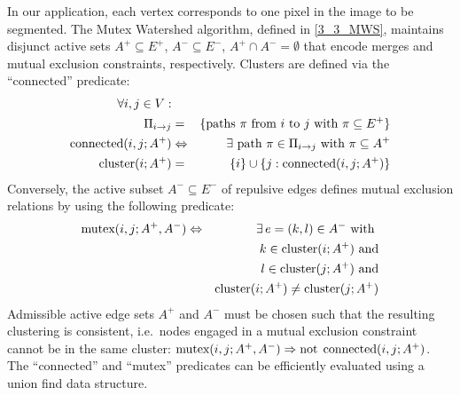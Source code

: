 In our application, each vertex corresponds to one pixel in the image to be segmented. 
The Mutex Watershed algorithm, defined in \autoref{3_3_MWS}, maintains disjunct active sets $A^+ \subseteq E^+$, $A^- \subseteq E^-$, $A^+ \cap A^- = \emptyset$ that encode merges and mutual exclusion constraints, respectively. Clusters are defined via the ``connected'' predicate: %
\begin{eqnarray*}
\forall i,j\in V:\\
\Pi_{i \rightarrow j} & = & \{ \text{paths } \pi\text{ from }i\text{ to }j\text{ with }\pi\subseteq E^+\}\\
\textrm{connected}(i, j; A^+)&\Leftrightarrow& \exists \text{ path } \pi \in \Pi_{i \rightarrow j} \text{ with }\pi \subseteq A^+ \\
\textrm{cluster}(i; A^+) & = & \{i\} \cup \{j: \textrm{connected}(i,j; A^+) \}
\end{eqnarray*}
Conversely, the active subset $A^-\subseteq E^-$ of repulsive edges defines mutual exclusion relations by using the following predicate: %
\begin{eqnarray*}
\textrm{mutex}(i, j; A^+, A^-)&\Leftrightarrow& \exists \, e=(k,l)\in A^- \text{ with } \\ && k \in \textrm{cluster}(i; A^+) \text{ and}\\
& & l \in \textrm{cluster}(j; A^+) \text{ and} \\
&&\textrm{cluster}(i; A^+) \neq \textrm{cluster}(j; A^+)
\end{eqnarray*}
Admissible active edge sets $A^+$ and $A^-$ must be chosen such that the resulting clustering is consistent, i.e.\ nodes engaged in a mutual exclusion constraint cannot be in the same cluster:
$\textrm{mutex}(i,j; A^+, A^-) \Rightarrow \textrm{not} \:\: \textrm{connected}(i, j; A^+)$.
The ``connected'' and ``mutex'' predicates can be efficiently evaluated using a union find data structure.

